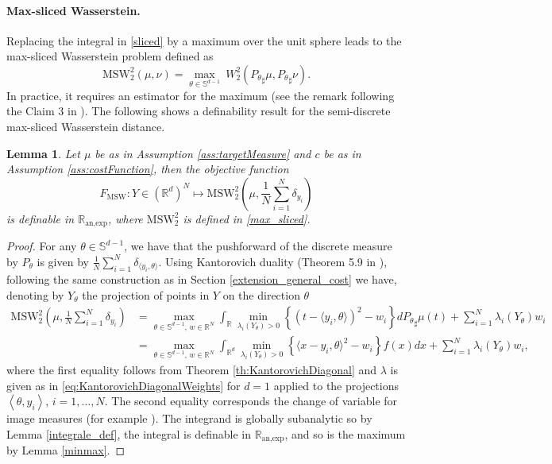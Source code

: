 \documentclass[11pt]{article}
\newcommand{\1}{\mathbbm{1}}
\newtheorem{lem}{Lemma}[section]
\numberwithin{equation}{section}
\begin{document}
\paragraph{Max-sliced Wasserstein.}
Replacing the integral in \eqref{sliced} by a maximum over the unit sphere leads to the max-sliced Wasserstein problem \cite{kolouri2019generalized, deshpande2019max} defined as
\begin{equation}\label{max_sliced}
    \text{MSW}_{2}^{2}(\mu,\nu)=\underset{\theta \in \mathbb{S}^{d-1}}{\max} \ W_{2}^{2}({P_{\theta}}_{\sharp}\mu,{P_{\theta}}_{\sharp}\nu).
\end{equation}
In practice, it requires an estimator for the maximum (see the remark following the Claim 3 in \cite{deshpande2019max}). The following shows a definability result for the semi-discrete max-sliced Wasserstein distance.
\begin{lem}
	Let $\mu$ be as in Assumption \ref{ass:targetMeasure} and $c$ be as in Assumption \ref{ass:costFunction}, then the objective function 
	\begin{equation}
		F_{\text{MSW}}: Y\in (\mathbb{R}^{d})^{N}\longmapsto \text{MSW}_{2}^{2}\left(\mu,\frac{1}{N}\sum_{i=1}^{N}\delta_{y_{i}}\right)
	\end{equation}	
	is definable in $\mathbb{R}_{\text{an,exp}}$, where $\text{MSW}_{2}^{2}$ is defined in \eqref{max_sliced}.
\end{lem}
\begin{proof}
	For any $\theta\in \mathbb{S}^{d-1}$, we have that the pushforward of the discrete measure by $P_\theta$ is given by $\frac{1}{N}\sum_{i=1}^{N}\delta_{\langle y_{i},\theta \rangle}$. 
	Using Kantorovich duality (Theorem 5.9 in \cite{villanioptoldnew}), following the same construction as in Section \ref{extension_general_cost} we have, denoting by $Y_\theta$ the projection of points in $Y$ on the direction $\theta$
	\begin{align*}
		\text{MSW}_{2}^{2}\left(\mu,\frac{1}{N}\sum_{i=1}^{N}\delta_{y_{i}}\right)&=\underset{\theta\in \mathbb{S}^{d-1},\, w\in \mathbb{R}^{N}}{\max}\int_{\mathbb{R}}\underset{\lambda_i(Y_\theta) > 0}{\min}\left\{ (t-\langle y_{i},\theta \rangle)^{2}-w_{i} \right\}d{P_{\theta}}_{\sharp}\mu(t)+\sum_{i=1}^{N}\lambda_i(Y_\theta) w_{i}\\
	    &=\underset{\theta\in \mathbb{S}^{d-1},\, w\in \mathbb{R}^{N}}{\max}\int_{\mathbb{R}^{d}}\underset{\lambda_i(Y_\theta)> 0}{\min}\left\{ \langle x-y_{i},\theta \rangle^{2}-w_{i} \right\}f(x)dx + \sum_{i=1}^{N} \lambda_i(Y_\theta) w_{i},
	\end{align*}
	where the first equality follows from Theorem \ref{th:KantorovichDiagonal} and $\lambda$ is given as in \eqref{eq:KantorovichDiagonalWeights} for $d = 1$ applied to the projections $\left\langle \theta,y_i \right\rangle$, $i = 1,\ldots, N$.
	The second equality corresponds the change of variable for image measures (for example \cite[Theorem 3.6.1]{MeasuretheoryBogachev}). The integrand is globally subanalytic so by Lemma \ref{integrale_def}, the integral is definable in $\mathbb{R}_{\text{an,exp}}$, and so is the maximum by Lemma \ref{minmax}.

\end{proof}
\end{document}
